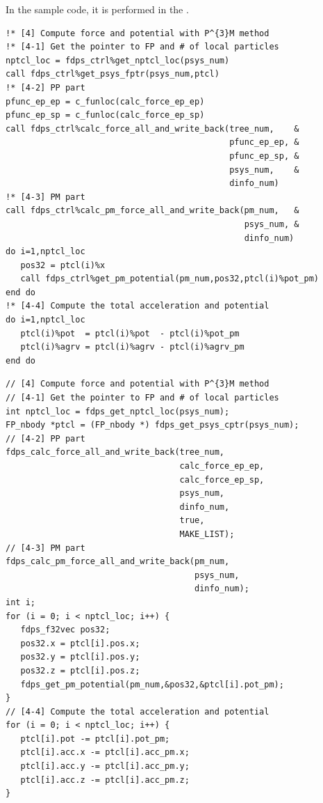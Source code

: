 \ifIF
In the sample code, it is performed in the \mainFunc.
\endifIF
\ifFtn
\begin{lstlisting}[caption=Interaction calculation]
!* [4] Compute force and potential with P^{3}M method
!* [4-1] Get the pointer to FP and # of local particles
nptcl_loc = fdps_ctrl%get_nptcl_loc(psys_num)
call fdps_ctrl%get_psys_fptr(psys_num,ptcl)
!* [4-2] PP part
pfunc_ep_ep = c_funloc(calc_force_ep_ep)
pfunc_ep_sp = c_funloc(calc_force_ep_sp)
call fdps_ctrl%calc_force_all_and_write_back(tree_num,    &
                                             pfunc_ep_ep, &
                                             pfunc_ep_sp, &
                                             psys_num,    &
                                             dinfo_num)
!* [4-3] PM part
call fdps_ctrl%calc_pm_force_all_and_write_back(pm_num,   &
                                                psys_num, &
                                                dinfo_num)
do i=1,nptcl_loc
   pos32 = ptcl(i)%x
   call fdps_ctrl%get_pm_potential(pm_num,pos32,ptcl(i)%pot_pm)
end do
!* [4-4] Compute the total acceleration and potential
do i=1,nptcl_loc
   ptcl(i)%pot  = ptcl(i)%pot  - ptcl(i)%pot_pm
   ptcl(i)%agrv = ptcl(i)%agrv - ptcl(i)%agrv_pm
end do
\end{lstlisting}
\endifFtn
\ifC
\begin{lstlisting}[caption=Interaction calculation]
// [4] Compute force and potential with P^{3}M method
// [4-1] Get the pointer to FP and # of local particles
int nptcl_loc = fdps_get_nptcl_loc(psys_num);
FP_nbody *ptcl = (FP_nbody *) fdps_get_psys_cptr(psys_num);
// [4-2] PP part
fdps_calc_force_all_and_write_back(tree_num,
                                   calc_force_ep_ep,
                                   calc_force_ep_sp,
                                   psys_num,
                                   dinfo_num,
                                   true,
                                   MAKE_LIST);
// [4-3] PM part
fdps_calc_pm_force_all_and_write_back(pm_num,
                                      psys_num,
                                      dinfo_num);
int i;
for (i = 0; i < nptcl_loc; i++) {
   fdps_f32vec pos32;
   pos32.x = ptcl[i].pos.x;
   pos32.y = ptcl[i].pos.y;
   pos32.z = ptcl[i].pos.z;
   fdps_get_pm_potential(pm_num,&pos32,&ptcl[i].pot_pm);
}
// [4-4] Compute the total acceleration and potential
for (i = 0; i < nptcl_loc; i++) {
   ptcl[i].pot -= ptcl[i].pot_pm;
   ptcl[i].acc.x -= ptcl[i].acc_pm.x;
   ptcl[i].acc.y -= ptcl[i].acc_pm.y;
   ptcl[i].acc.z -= ptcl[i].acc_pm.z;
}
\end{lstlisting}
